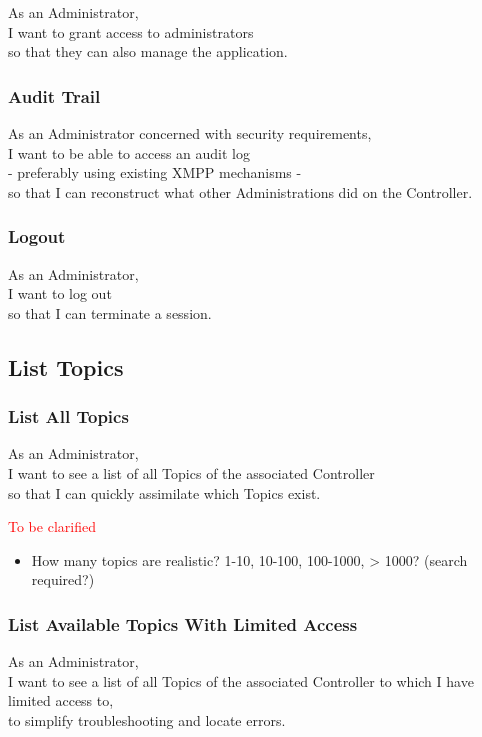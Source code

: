 As an Administrator,\\
I want to grant access to administrators \\
so that they can also manage the application.

\subsubsection{Audit Trail}

As an Administrator concerned with security requirements,\\
I want to be able to access an audit log\\
- preferably using existing XMPP mechanisms - \\
so that I can reconstruct what other Administrations did on the Controller.

\subsubsection{Logout}

As an Administrator,\\
I want to log out\\
so that I can terminate a session.

\subsection{List Topics}

\subsubsection{List All Topics}
As an Administrator,\\
I want to see a list of all Topics of the associated Controller\\
so that I can quickly assimilate which Topics exist.

\noindent\textcolor{red}{To be clarified}

\begin{itemize}
    \item How many topics are realistic? 1-10, 10-100, 100-1000, > 1000? (search required?)
\end{itemize}


\subsubsection{List Available Topics With Limited Access}

As an Administrator,\\
I want to see a list of all Topics of the associated Controller to which I have limited access to,\\
to simplify troubleshooting and locate errors.

